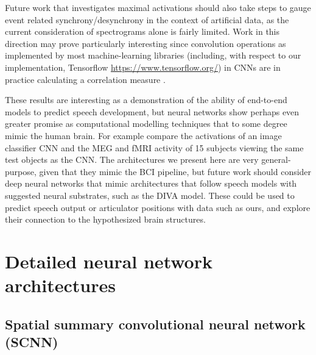 \documentclass[fleqn,10pt]{wlscirep}
\begin{document}
Future work that investigates maximal activations should also take steps to gauge event related synchrony/desynchrony in the context of artificial data, as the current consideration of spectrograms alone is fairly limited. Work in this direction may prove particularly interesting since convolution operations as implemented by most machine-learning libraries (including, with respect to our implementation, Tensorflow \url{https://www.tensorflow.org/}) in CNNs are in practice calculating a correlation measure \cite{GravesRNNBook}.

These results are interesting as a demonstration of the ability of end-to-end models to predict speech development, but neural networks show perhaps even greater promise as computational modelling techniques that to some degree mimic the human brain. For example \cite{cichy2016} compare the activations of an image classifier CNN and the MEG and fMRI activity of 15 subjects viewing the same test objects as the CNN. The architectures we present here are very general-purpose, given that they mimic the BCI pipeline, but future work should consider deep neural networks that mimic architectures that follow speech models with suggested neural substrates, such as the DIVA model\cite{Guenther2005}. These could be used to predict speech output or articulator positions with data such as ours, and explore their connection to the hypothesized brain structures.

\section*{Detailed neural network architectures}

\subsection*{Spatial summary convolutional neural network (SCNN)} \label{sec:scnn}
\end{document}
